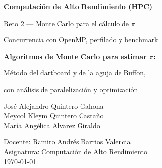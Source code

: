 \begin{titlepage}
    \centering
    \vspace*{2cm}

    {\Large\bfseries Computación de Alto Rendimiento (HPC)\par}
    \vspace{0.5cm}
    {\Large Reto 2 --- Monte Carlo para el cálculo de $\pi$\par}
    \vspace{0.2cm}
    {\Large Concurrencia con OpenMP, perfilado y benchmark\par}

    \vspace{2cm}

    {\Huge\bfseries Algoritmos de Monte Carlo para estimar $\pi$:\par}
    \vspace{0.3cm}
    {\Large Método del dartboard y de la aguja de Buffon,\par}
    \vspace{0.2cm}
    {\Large con análisis de paralelización y optimización\par}

    \vspace{2cm}

    {\Large
    José Alejandro Quintero Gahona\\[0.3cm]
    Meycol Kleym Quintero Castaño\\[0.3cm]
    María Angélica Alvarez Giraldo\\[0.3cm]
    }

    \vfill

    {\large
    Docente: Ramiro Andrés Barrios Valencia\\[0.3cm]
    Asignatura: Computación de Alto Rendimiento\\[0.3cm]
    \today
    \par}
\end{titlepage}
